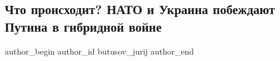  
 
 
 
 
 
\subsection{Что происходит? НАТО и Украина побеждают Путина в гибридной войне}
\label{sec:12_02_2022.fb.butusov_jurij.1.ukraina_putin_gibrid_vojna}
 
\ifcmt
 author_begin
   author_id butusov_jurij
 author_end
\fi
